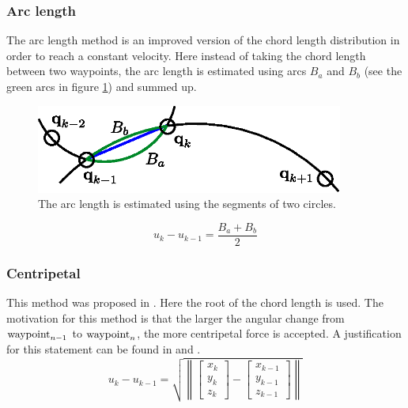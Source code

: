 \subsubsection{Arc length}
The arc length method is an improved version of the chord length distribution in order to reach a constant velocity. Here instead of taking the chord length between two waypoints, the arc length is estimated using arcs $B_a$ and $B_b$ (see the green arcs in figure \ref{fig:arcLength}) and summed up. %


\begin{figure}[H]
	\centering
    \includegraphics[width = 0.9\textwidth]{graphics/arcLength.eps}
  \caption{The arc length is estimated using the segments of two circles.}
  \label{fig:arcLength}
\end{figure}


\begin{equation*}
u_k-u_{k-1}=\frac{B_a+B_b}{2}
\end{equation*}

\subsubsection{Centripetal}
This method was proposed in \cite{lee}. Here the root of the chord length is used. The motivation for this method is that the larger the angular change from $\textnormal{waypoint}_{n-1}$ to $\textnormal{waypoint}_n$, the more centripetal force is accepted. A justification for this statement can be found in \cite{doessegger} and \cite{lee}.
\begin{equation*}
u_k-u_{k-1}=\sqrt{\left \| \begin{bmatrix}x_k\\y_k\\z_k \end{bmatrix}-\begin{bmatrix}x_{k-1}\\y_{k-1}\\z_{k-1} \end{bmatrix}\right \|}
\end{equation*}

